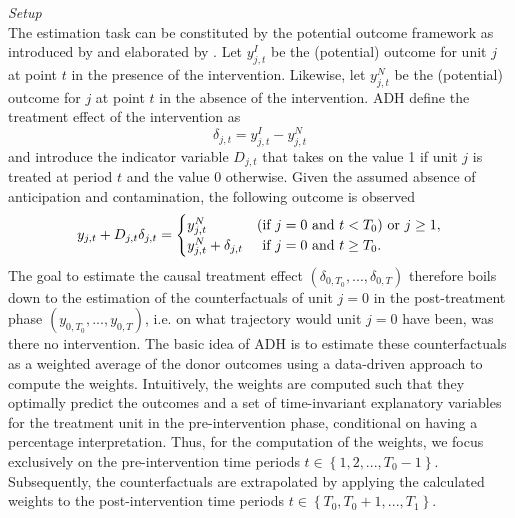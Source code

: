 \textit{Setup} \\
The estimation task can be constituted by the potential outcome framework as introduced by \cite{neyman:1923} and elaborated by \cite{rubin:1974}. Let $y^{I}_{j,t}$ be the (potential) outcome for unit $j$ at point $t$ in the presence of the intervention. Likewise, let $y^{N}_{j,t}$ be the (potential) outcome for $j$ at point $t$ in the absence of the intervention. \ac{ADH} define the treatment effect of the intervention as 
\[
\delta_{j,t} = y^{I}_{j,t} - y^{N}_{j,t}
\] 
and introduce the indicator variable $D_{j,t}$ that takes on the value 1 if unit $j$ is treated at period $t$ and the value 0 otherwise. Given the assumed absence of anticipation and contamination, the following outcome is observed
\[
y_{j,t} + D_{j,t} \delta_{j,t} = 
\begin{cases}
	y^{N}_{j,t} &\text{(if } j = 0 \text{ and } t < T_0\text{)} \text{ or } j \geq 1, \\
	y^{N}_{j,t} + \delta_{j,t} &  \text{\phantom{(}if } j = 0 \text{ and } t \geq T_0.
\end{cases}
\] 
The goal to estimate the causal treatment effect $(\delta_{0,T_0}, ..., \delta_{0,T})$ therefore boils down to the estimation of the counterfactuals of unit $j = 0$ in the post-treatment phase $(y_{0,T_0}, ..., y_{0,T})$, i.e. on what trajectory would unit $j=0$ have been, was there no intervention. The basic idea of \ac{ADH} is to estimate these counterfactuals as a weighted average of the donor outcomes using a data-driven approach to compute the weights. 
Intuitively, the weights are computed such that they optimally predict the outcomes and a set of time-invariant explanatory variables for the treatment unit in the pre-intervention phase, conditional on having a percentage interpretation. Thus, for the computation of the weights, we focus exclusively on the pre-intervention time periods $t \in \left\lbrace 1,2, ..., T_{0}-1\right\rbrace $. Subsequently, the counterfactuals are extrapolated by applying the calculated weights to the post-intervention time periods $t \in \left\lbrace T_{0},T_{0}+1, ..., T_{1}\right\rbrace $.

